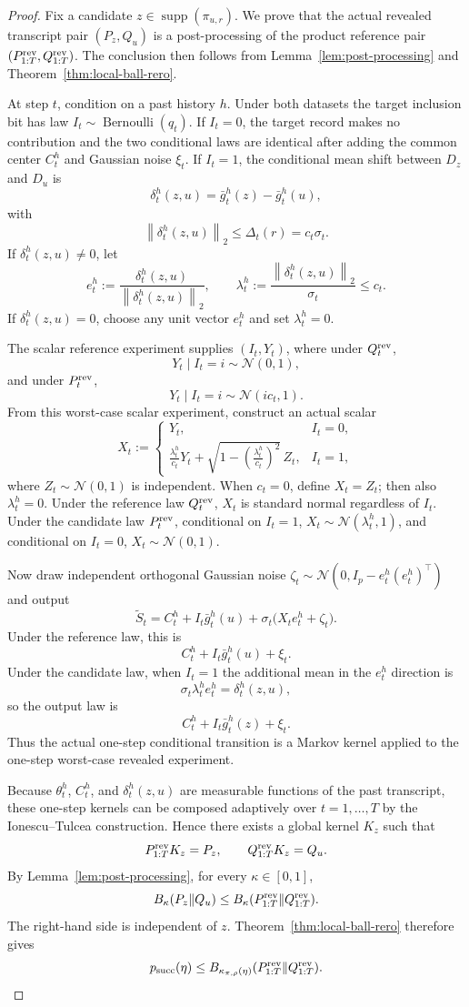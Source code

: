 \documentclass[conference,compsoc]{IEEEtran}
\DeclareMathOperator{\supp}{supp}
\DeclareMathOperator{\Ber}{Bernoulli}
\newcommand{\N}{\mathcal{N}}
\newcommand{\norm}[1]{\left\lVert #1\right\rVert}
\begin{document}
\begin{proof}
Fix a candidate $z\in\supp(\pi_{u,r})$.  We prove that the actual revealed
transcript pair $(P_z,Q_u)$ is a post-processing of the product reference pair
$(P_{1:T}^{\rm rev},Q_{1:T}^{\rm rev})$.  The conclusion then follows from
Lemma~\ref{lem:post-processing} and Theorem~\ref{thm:local-ball-rero}.

At step $t$, condition on a past history $h$.  Under both datasets the target
inclusion bit has law $I_t\sim\Ber(q_t)$.  If $I_t=0$, the target record makes
no contribution and the two conditional laws are identical after adding the
common center $C_t^h$ and Gaussian noise $\xi_t$.  If $I_t=1$, the conditional
mean shift between $D_z$ and $D_u$ is
\[
\delta_t^h(z,u)=\bar g_t^h(z)-\bar g_t^h(u),
\]
with
\[
\norm{\delta_t^h(z,u)}_2\le \Delta_t(r)=c_t\sigma_t.
\]
If $\delta_t^h(z,u)\ne0$, let
\[
e_t^h:=\frac{\delta_t^h(z,u)}{\norm{\delta_t^h(z,u)}_2},
\qquad
\lambda_t^h:=\frac{\norm{\delta_t^h(z,u)}_2}{\sigma_t}\le c_t.
\]
If $\delta_t^h(z,u)=0$, choose any unit vector $e_t^h$ and set
$\lambda_t^h=0$.

The scalar reference experiment supplies $(I_t,Y_t)$, where under
$Q_t^{\rm rev}$,
\[
Y_t\mid I_t=i\sim\N(0,1),
\]
and under $P_t^{\rm rev}$,
\[
Y_t\mid I_t=i\sim\N(ic_t,1).
\]
From this worst-case scalar experiment, construct an actual scalar
\[
X_t:=
\begin{cases}
Y_t, & I_t=0,\\
\displaystyle \frac{\lambda_t^h}{c_t}Y_t+\sqrt{1-\left(\frac{\lambda_t^h}{c_t}\right)^2}\,Z_t,
& I_t=1,
\end{cases}
\]
where $Z_t\sim\N(0,1)$ is independent.  When $c_t=0$, define $X_t=Z_t$; then
also $\lambda_t^h=0$.  Under the reference law $Q_t^{\rm rev}$, $X_t$ is
standard normal regardless of $I_t$.  Under the candidate law $P_t^{\rm rev}$,
conditional on $I_t=1$, $X_t\sim\N(\lambda_t^h,1)$, and conditional on
$I_t=0$, $X_t\sim\N(0,1)$.

Now draw independent orthogonal Gaussian noise
$\zeta_t\sim\N(0,I_p-e_t^h(e_t^h)^\top)$ and output
\[
\tilde S_t=C_t^h+I_t\bar g_t^h(u)+\sigma_t\bigl(X_te_t^h+\zeta_t\bigr).
\]
Under the reference law, this is
\[
C_t^h+I_t\bar g_t^h(u)+\xi_t.
\]
Under the candidate law, when $I_t=1$ the additional mean in the
$e_t^h$ direction is
\[
\sigma_t\lambda_t^h e_t^h=\delta_t^h(z,u),
\]
so the output law is
\[
C_t^h+I_t\bar g_t^h(z)+\xi_t.
\]
Thus the actual one-step conditional transition is a Markov kernel applied to
the one-step worst-case revealed experiment.

Because $\theta_t^h$, $C_t^h$, and $\delta_t^h(z,u)$ are measurable functions of
the past transcript, these one-step kernels can be composed adaptively over
$t=1,\ldots,T$ by the Ionescu--Tulcea construction.  Hence there exists a
global kernel $K_z$ such that
\[
P_{1:T}^{\rm rev}K_z=P_z,
\qquad
Q_{1:T}^{\rm rev}K_z=Q_u.
\]
By Lemma~\ref{lem:post-processing}, for every $\kappa\in[0,1]$,
\[
B_\kappa(P_z\|Q_u)
\le
B_\kappa(P_{1:T}^{\rm rev}\|Q_{1:T}^{\rm rev}).
\]
The right-hand side is independent of $z$.  Theorem~\ref{thm:local-ball-rero}
therefore gives
\[
p_{\rm succ}(\eta)
\le
B_{\kappa_{\pi,\rho}(\eta)}(P_{1:T}^{\rm rev}\|Q_{1:T}^{\rm rev}).
\]
\end{proof}
\end{document}

